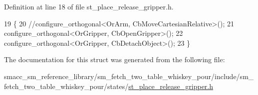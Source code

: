 Definition at line 18 of file st\+\_\+place\+\_\+release\+\_\+gripper.\+h.


\begin{DoxyCode}
19         \{
20             \textcolor{comment}{//configure\_orthogonal<OrArm, CbMoveCartesianRelative>();}
21             configure\_orthogonal<OrGripper, CbOpenGripper>();
22             configure\_orthogonal<OrGripper, CbDetachObject>();
23         \}
\end{DoxyCode}


The documentation for this struct was generated from the following file\+:\begin{DoxyCompactItemize}
\item 
smacc\+\_\+sm\+\_\+reference\+\_\+library/sm\+\_\+fetch\+\_\+two\+\_\+table\+\_\+whiskey\+\_\+pour/include/sm\+\_\+fetch\+\_\+two\+\_\+table\+\_\+whiskey\+\_\+pour/states/\hyperlink{st__place__release__gripper_8h}{st\+\_\+place\+\_\+release\+\_\+gripper.\+h}\end{DoxyCompactItemize}
